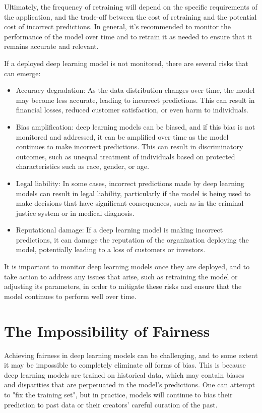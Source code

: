 Ultimately, the frequency of retraining will depend on the specific requirements of the application, and the trade-off between the cost of retraining and the potential cost of incorrect predictions. In general, it’s recommended to monitor the performance of the model over time and to retrain it as needed to ensure that it remains accurate and relevant.

If a deployed deep learning model is not monitored, there are several risks that can emerge:

\begin{itemize}
\item Accuracy degradation: As the data distribution changes over time, the model may become less accurate, leading to incorrect predictions. This can result in financial losses, reduced customer satisfaction, or even harm to individuals.
\item Bias amplification: deep learning models can be biased, and if this bias is not monitored and addressed, it can be amplified over time as the model continues to make incorrect predictions. This can result in discriminatory outcomes, such as unequal treatment of individuals based on protected characteristics such as race, gender, or age.
\item Legal liability: In some cases, incorrect predictions made by deep learning models can result in legal liability, particularly if the model is being used to make decisions that have significant consequences, such as in the criminal justice system or in medical diagnosis.
\item Reputational damage: If a deep learning model is making incorrect predictions, it can damage the reputation of the organization deploying the model, potentially leading to a loss of customers or investors.
\end{itemize}


It is important to monitor deep learning models once they are deployed, and to take action to address any issues that arise, such as retraining the model or adjusting its parameters, in order to mitigate these risks and ensure that the model continues to perform well over time.

\section{The Impossibility of Fairness}

Achieving fairness in deep learning models can be challenging, and to some extent it may be impossible to completely eliminate all forms of bias. This is because deep learning models are trained on historical data, which may contain biases and disparities that are perpetuated in the model’s predictions. One can attempt to "fix the training set", but in practice, models will continue to bias their prediction to past data or their creators’ careful curation of the past.

